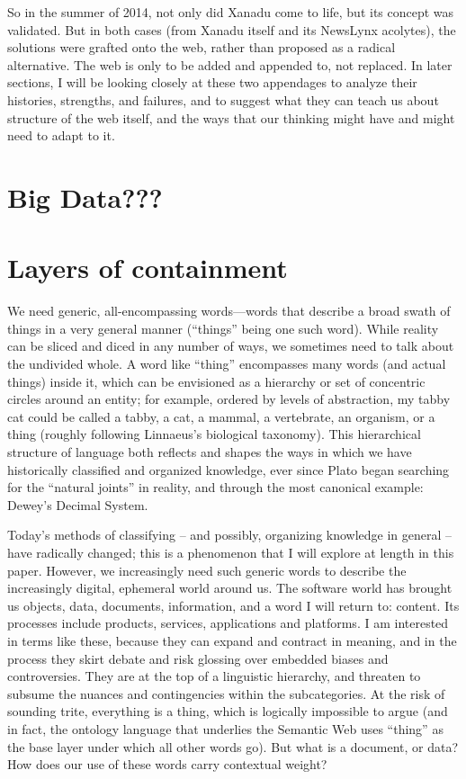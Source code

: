 So in the summer of 2014, not only did Xanadu come to life, but its concept was validated. But in both cases (from Xanadu itself and its NewsLynx acolytes), the solutions were grafted onto the web, rather than proposed as a radical alternative. The web is only to be added and appended to, not replaced. In later sections, I will be looking closely at these two appendages to analyze their histories, strengths, and failures, and to suggest what they can teach us about structure of the web itself, and the ways that our thinking might have and might need to adapt to it.

\section{Big Data???}

\section{Layers of containment}

We need generic, all-encompassing words—words that describe a broad swath of things in a very general manner (“things” being one such word). While reality can be sliced and diced in any number of ways, we sometimes need to talk about the undivided whole. A word like “thing” encompasses many words (and actual things) inside it, which can be envisioned as a hierarchy or set of concentric circles around an entity; for example, ordered by levels of abstraction, my tabby cat could be called a tabby, a cat, a mammal, a vertebrate, an organism, or a thing (roughly following Linnaeus’s biological taxonomy). This hierarchical structure of language both reflects and shapes the ways in which we have historically classified and organized knowledge, ever since Plato began searching for the “natural joints” in reality, and through the most canonical example: Dewey’s Decimal System.

Today’s methods of classifying – and possibly, organizing knowledge in general – have radically changed; this is a phenomenon that I will explore at length in this paper. However, we increasingly need such generic words to describe the increasingly digital, ephemeral world around us. The software world has brought us objects, data, documents, information, and a word I will return to: content. Its processes include products, services, applications and platforms. I am interested in terms like these, because they can expand and contract in meaning, and in the process they skirt debate and risk glossing over embedded biases and controversies. They are at the top of a linguistic hierarchy, and threaten to subsume the nuances and contingencies within the subcategories. At the risk of sounding trite, everything is a thing, which is logically impossible to argue (and in fact, the ontology language that underlies the Semantic Web uses “thing” as the base layer under which all other words go). But what is a document, or data? How does our use of these words carry contextual weight?

